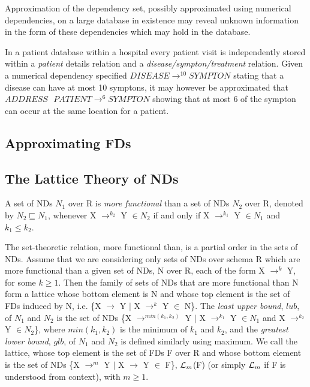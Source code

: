 Approximation of the dependency set, possibly approximated using numerical
dependencies, on a large database in existence may reveal unknown information
in the form of these dependencies which may hold in the database.  

\begin{example}
\begin{rm}
In a patient database within a hospital every patient visit is independently stored
within a {\em patient} details relation and a {\em disease/sympton/treatment} relation. 
Given a numerical dependency specified $DISEASE \to^{10} SYMPTON$ stating
that a disease can have at most 10 symptons, it may however be approximated
that $ADDRESS \: \: \: PATIENT \to^{6} SYMPTON$ showing that at most
6 of the sympton can occur at the same location for a patient.
\end{rm}
\end{example}

\subsection{Approximating FDs}


\subsection{The Lattice Theory of NDs}




\begin{definition}\label{def:more}
\begin{rm}
A set of NDs $N_1$ over R is {\em more functional} than a set of NDs 
$N_2$ over R, denoted by $N_2 \sqsubseteq N_1$, whenever
X $\to^{k_2}$ Y $\in N_2$ if and only if X $\to^{k_1}$ Y $\in N_1$ and 
$k_1 \le k_2$. 
\end{rm}
\end{definition}
\medskip

The set-theoretic relation, more functional than, 
is a partial order in the sets of NDs.
Assume that we are considering only sets of NDs over schema R which are more functional 
than a given set of NDs, N over R, each of the form X $\to^k$ Y, 
for some $k \ge 1$.
Then the family of sets of NDs that are more functional than N form a lattice
whose bottom element is N and whose top element is the set of FDs
induced by N, i.e. \{X $\to$ Y $\mid$ X $\to^k$ Y $\in$ N\}.
The {\em least upper bound}, $lub$, of $N_1$ and $N_2$ is the set of NDs
\{X $\to^{min(k_1, k_2)}$ Y $\mid$
X $\to^{k_1}$ Y $\in N_1$ and X $\to^{k_2}$ Y $\in N_2$\},
where $min(k_1, k_2)$ is the minimum of $k_1$ and $k_2$, and the 
{\em greatest lower bound}, $glb$, of $N_1$ and $N_2$ is defined similarly using maximum.
We call the lattice, whose top element is the set of FDs F over R
and whose bottom element is the set of NDs
\{X $\to^m$ Y $\mid$ X $\to$ Y $\in$ F\}, ${\cal L}_m$(F)
(or simply ${\cal L}_m$ if F is understood from context), with $m \ge 1$.


